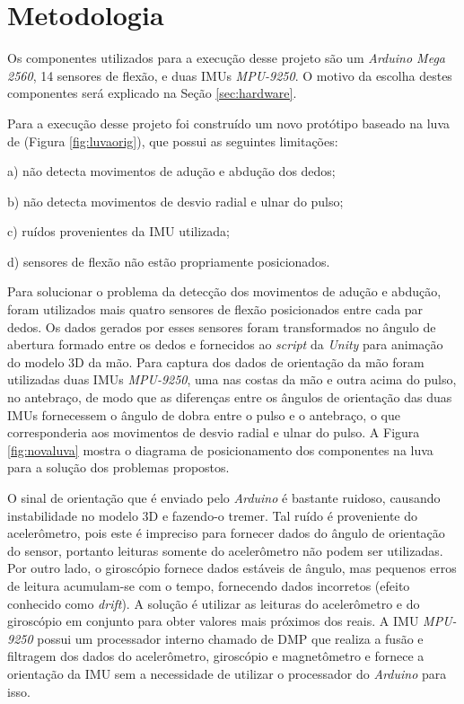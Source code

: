 \chapter{Metodologia}
\label{ch:meto}

\vspace{-1.9cm}
Os componentes utilizados para a execução desse projeto são um \textit{Arduino Mega 2560}, 14 sensores de flexão, e duas \ac{IMU}s \textit{MPU-9250}. O motivo da escolha destes componentes será explicado na Seção \ref{sec:hardware}.

Para a execução desse projeto foi construído um novo protótipo baseado na luva de  (Figura \ref{fig:luvaorig}), que possui as seguintes limitações:

\begin{compactitem}
  \item[a)] não detecta movimentos de adução e abdução dos dedos;
  \item[b)] não detecta movimentos de desvio radial e ulnar do pulso;
  \item[c)] ruídos provenientes da \ac{IMU} utilizada;
  \item[d)] sensores de flexão não estão propriamente posicionados.
\end{compactitem}

Para solucionar o problema da detecção dos movimentos de adução e abdução, foram utilizados mais quatro sensores de flexão posicionados entre cada par dedos. Os dados gerados por esses sensores foram transformados no ângulo de abertura formado entre os dedos e fornecidos ao \textit{script} da \textit{Unity} para animação do modelo \ac{3D} da mão. Para captura dos dados de orientação da mão foram utilizadas duas \ac{IMU}s \textit{MPU-9250}, uma nas costas da mão e outra acima do pulso, no antebraço, de modo que as diferenças entre os ângulos de orientação das duas \ac{IMU}s fornecessem o ângulo de dobra entre o pulso e o antebraço, o que corresponderia aos movimentos de desvio radial e ulnar do pulso. A Figura \ref{fig:novaluva} mostra o diagrama de posicionamento dos componentes na luva para a solução dos problemas propostos.

O sinal de orientação que é enviado pelo \textit{Arduino} é bastante ruidoso, causando instabilidade no modelo \ac{3D} e fazendo-o tremer. Tal ruído é proveniente do acelerômetro, pois este é impreciso para fornecer dados do ângulo de orientação do sensor, portanto leituras somente do acelerômetro não podem ser utilizadas. Por outro lado, o giroscópio fornece dados estáveis de ângulo, mas pequenos erros de leitura acumulam-se com o tempo, fornecendo dados incorretos (efeito conhecido como \textit{drift}). A solução é utilizar as leituras do acelerômetro e do giroscópio em conjunto para obter valores mais próximos dos reais. A \ac{IMU} \textit{MPU-9250} possui um processador interno chamado de \ac{DMP} que realiza a fusão e filtragem dos dados do acelerômetro, giroscópio e magnetômetro e fornece a orientação da \ac{IMU} sem a necessidade de utilizar o processador do \textit{Arduino} para isso.

